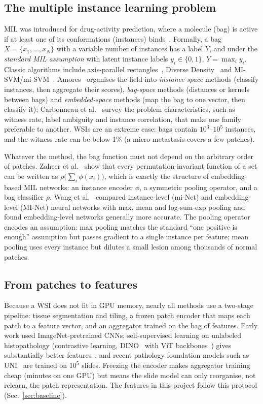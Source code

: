 \documentclass[conference]{IEEEtran}
\begin{document}
\subsection{The multiple instance learning problem}
MIL was introduced for drug-activity prediction, where a molecule (bag) is active if at least one of its conformations (instances) binds~\cite{dietterich1997}. Formally, a bag $X=\{x_1,\dots,x_N\}$ with a variable number of instances has a label $Y$, and under the \emph{standard MIL assumption} with latent instance labels $y_i\in\{0,1\}$, $Y=\max_i y_i$. Classic algorithms include axis-parallel rectangles~\cite{dietterich1997}, Diverse Density~\cite{maron1998} and MI-SVM/mi-SVM~\cite{andrews2003}. Amores~\cite{amores2013} organises the field into \emph{instance-space} methods (classify instances, then aggregate their scores), \emph{bag-space} methods (distances or kernels between bags) and \emph{embedded-space} methods (map the bag to one vector, then classify it); Carbonneau et al.~\cite{carbonneau2018} survey the problem characteristics, such as witness rate, label ambiguity and instance correlation, that make one family preferable to another. WSIs are an extreme case: bags contain $10^3$--$10^5$ instances, and the witness rate can be below 1\% (a micro-metastasis covers a few patches).

Whatever the method, the bag function must not depend on the arbitrary order of patches. Zaheer et al.~\cite{zaheer2017} show that every permutation-invariant function of a set can be written as $\rho\big(\sum_i \phi(x_i)\big)$, which is exactly the structure of embedding-based MIL networks: an instance encoder $\phi$, a symmetric pooling operator, and a bag classifier $\rho$. Wang et al.~\cite{wang2018revisiting} compared instance-level (mi-Net) and embedding-level (MI-Net) neural networks with max, mean and log-sum-exp pooling and found embedding-level networks generally more accurate. The pooling operator encodes an assumption: max pooling matches the standard ``one positive is enough'' assumption but passes gradient to a single instance per feature; mean pooling uses every instance but dilutes a small lesion among thousands of normal patches.

\subsection{From patches to features}
Because a WSI does not fit in GPU memory, nearly all methods use a two-stage pipeline: tissue segmentation and tiling, a frozen patch encoder that maps each patch to a feature vector, and an aggregator trained on the bag of features. Early work used ImageNet-pretrained CNNs; self-supervised learning on unlabeled histopathology (contrastive learning, DINO~\cite{caron2021dino} with ViT backbones~\cite{dosovitskiy2021vit}) gives substantially better features~\cite{kang2023benchmarking,wang2022ctranspath}, and recent pathology foundation models such as UNI~\cite{chen2024uni} are trained on $10^5$ slides. Freezing the encoder makes aggregator training cheap (minutes on one GPU) but means the slide model can only reorganise, not relearn, the patch representation. The features in this project follow this protocol (Sec.~\ref{sec:baseline}).
\end{document}

